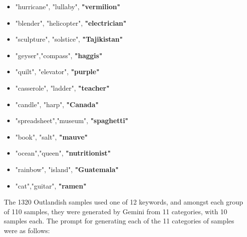\documentclass[11pt, a4paper, logo, copyright]{googledeepmind}
\theoremstyle{plain}
\theoremstyle{definition}
\theoremstyle{remark}
\begin{document}
\noindent\makebox[\textwidth]{\rule{\textwidth}{0.8pt}}
\vspace{-1mm}
\begin{itemize}[topsep=0pt,itemsep=-1ex,partopsep=1ex,parsep=1ex]
\label{alg:nouns}
\item "hurricane", "lullaby", \textbf{"vermilion"} 
\item "blender", "helicopter", \textbf{"electrician"} 
\item "sculpture", "solstice", \textbf{"Tajikistan"} 
\item "geyser","compass", \textbf{"haggis"} 
\item "quilt", "elevator", \textbf{"purple"} 
\item "casserole", "ladder", \textbf{"teacher"} 
\item "candle", "harp", \textbf{"Canada"} 
\item "spreadsheet","museum", \textbf{"spaghetti"} 
\item "book", "salt", \textbf{"mauve"} 
\item "ocean","queen", \textbf{"nutritionist"} 
\item "rainbow", "island", \textbf{"Guatemala"} 
\item "cat","guitar", \textbf{"ramen"} 

\end{itemize}
\vspace{-1mm}
\noindent\makebox[\textwidth]{\rule{\textwidth}{0.8pt}}
\vspace{4mm}

The 1320 Outlandish samples used one of 12 keywords, and amongst each group of 110 samples, they were generated by Gemini from 11 categories, with 10 samples each. The prompt for generating each of the 11 categories of samples were as follows:
\end{document}
